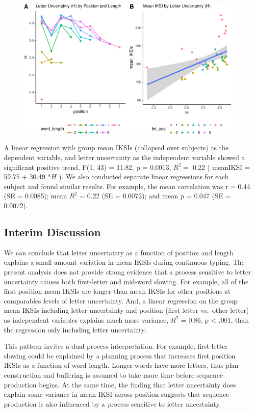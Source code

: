 \documentclass[floatsintext,man]{apa6}
\theoremstyle{definition}
\theoremstyle{definition}
\theoremstyle{definition}
\theoremstyle{remark}
\begin{document}
\begin{figure}[htbp]
\centering
\includegraphics{Entropy_typing_draft_files/figure-latex/letter_uncertainty_by_IKSI-1.pdf}
\caption{}
\end{figure}

A linear regression with group mean IKSIs (collapsed over subjects) as
the dependent variable, and letter uncertainty as the independent
variable showed a significant positive trend, F(1, 43) = 11.82, p =
0.0013, \(R^2 =\) 0.22 ( meanIKSI = 59.75 \(+\) 30.49 \(* H\) ). We also
conducted separate linear regressions for each subject and found similar
results. For example, the mean correlation was r = 0.44 (SE = 0.0085);
mean \(R^2\) = 0.22 (SE = 0.0072); and mean p = 0.047 (SE = 0.0072).

\subsection{Interim Discussion}\label{interim-discussion}

We can conclude that letter uncertainty as a function of position and
length explains a small amount variation in mean IKSIs during continuous
typing. The present analysis does not provide strong evidence that a
process sensitive to letter uncertainty causes both first-letter and
mid-word slowing. For example, all of the first position mean IKSIs are
longer than mean IKSIs for other positions at comparables levels of
letter uncertainty. And, a linear regression on the group mean IKSIs
including letter uncertainty and position (first letter vs.~other
letter) as independent variables explains much more variance, \(R^2\) =
0.86, p \textless{} .001, than the regression only including letter
uncertainty.

This pattern invites a dual-process interpretation. For example,
first-letter slowing could be explained by a planning process that
increases first position IKSIs as a function of word length. Longer
words have more letters, thus plan construction and buffering is assumed
to take more time before sequence production begins. At the same time,
the finding that letter uncertainty does explain some variance in mean
IKSI across position suggests that sequence production is also
influenced by a process sensitive to letter uncertainty.
\end{document}
